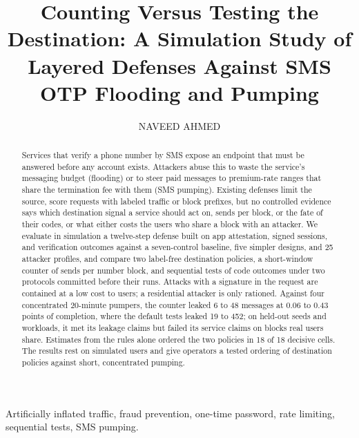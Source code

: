 \documentclass{IEEEoj}
\begin{document}

\title{Counting Versus Testing the Destination: A Simulation Study of Layered Defenses Against SMS OTP Flooding and Pumping}

\author{NAVEED AHMED}

\begin{abstract}
Services that verify a phone number by SMS expose an endpoint that must be answered before any account exists. Attackers abuse this to waste the service's messaging budget (flooding) or to steer paid messages to premium-rate ranges that share the termination fee with them (SMS pumping). Existing defenses limit the source, score requests with labeled traffic or block prefixes, but no controlled evidence says which destination signal a service should act on, sends per block, or the fate of their codes, or what either costs the users who share a block with an attacker. We evaluate in simulation a twelve-step defense built on app attestation, signed sessions, and verification outcomes against a seven-control baseline, five simpler designs, and 25 attacker profiles, and compare two label-free destination policies, a short-window counter of sends per number block, and sequential tests of code outcomes under two protocols committed before their runs. Attacks with a signature in the request are contained at a low cost to users; a residential attacker is only rationed. Against four concentrated 20-minute pumpers, the counter leaked 6 to 48 messages at 0.06 to 0.43 points of completion, where the default tests leaked 19 to 452; on held-out seeds and workloads, it met its leakage claims but failed its service claims on blocks real users share. Estimates from the rules alone ordered the two policies in 18 of 18 decisive cells. The results rest on simulated users and give operators a tested ordering of destination policies against short, concentrated pumping.
\end{abstract}

\begin{IEEEkeywords}
Artificially inflated traffic, fraud prevention, one-time password, rate limiting, sequential tests, SMS pumping.
\end{IEEEkeywords}
\end{document}
